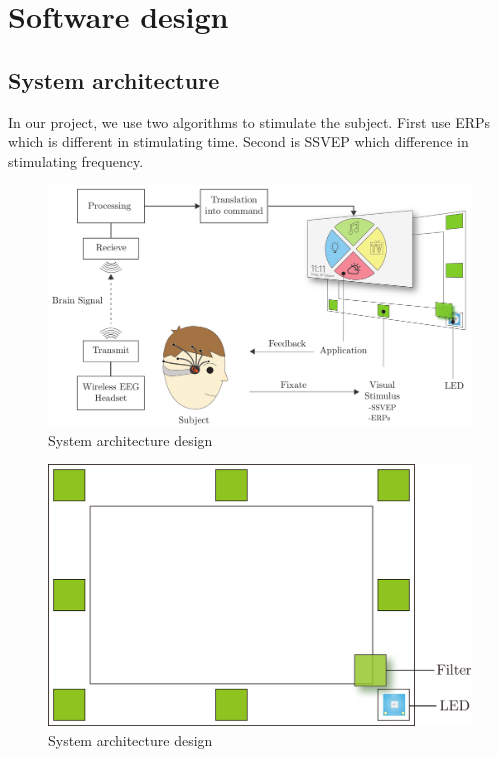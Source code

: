\chapter{Software design}

\label{ch:Software design}

\setlength{\parindent}{4em}
\setlength{\parskip}{1em}
\renewcommand{\baselinestretch}{1.5}

\section{System architecture}

\hspace{1.5cm}In our project, we use two algorithms to stimulate the subject. First use ERPs which is different in stimulating time. Second is SSVEP which difference in stimulating frequency.

\begin{figure}[ht]
	\centering
	\includegraphics[scale = 0.28]{chapter5/architec.pdf}
	\caption{System architecture design}
\end{figure}

\begin{figure}[ht]
	\centering
	\includegraphics[scale = 0.5]{chapter5/frame_led.pdf}
	\caption{System architecture design}
\end{figure}

